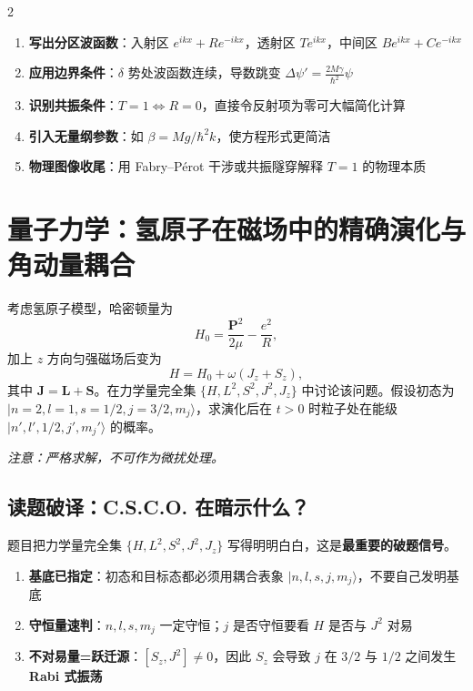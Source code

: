 \begin{multicols}{2}
\begin{thinkbox}
\begin{enumerate}
    \item \textbf{写出分区波函数}：入射区 $e^{ikx}+Re^{-ikx}$，透射区 $Te^{ikx}$，中间区 $Be^{ikx}+Ce^{-ikx}$
    \item \textbf{应用边界条件}：$\delta$ 势处波函数连续，导数跳变 $\Delta\psi' = \frac{2M\gamma}{\hbar^2}\psi$
    \item \textbf{识别共振条件}：$T=1 \Leftrightarrow R=0$，直接令反射项为零可大幅简化计算
    \item \textbf{引入无量纲参数}：如 $\beta = Mg/\hbar^2 k$，使方程形式更简洁
    \item \textbf{物理图像收尾}：用 Fabry--P\'erot 干涉或共振隧穿解释 $T=1$ 的物理本质
\end{enumerate}
\end{thinkbox}

\end{multicols}


\newpage
\section{量子力学：氢原子在磁场中的精确演化与角动量耦合}
\label{sec:zeeman-evolution}

\begin{modelbox}
考虑氢原子模型，哈密顿量为
\[
H_0 = \frac{\bm{P}^2}{2\mu} - \frac{e^2}{R},
\]
加上 $z$ 方向匀强磁场后变为
\[
H = H_0 + \omega (J_z + S_z),
\]
其中 $\bm{J} = \bm{L} + \bm{S}$。在力学量完全集 $\{H, L^2, S^2, J^2, J_z\}$ 中讨论该问题。假设初态为 $|n=2, l=1, s=1/2, j=3/2, m_j\rangle$，求演化后在 $t>0$ 时粒子处在能级 $|n', l', 1/2, j', m_j'\rangle$ 的概率。

\textit{注意：严格求解，不可作为微扰处理。}
\end{modelbox}

\subsection{读题破译：C.S.C.O. 在暗示什么？}

题目把力学量完全集 $\{H, L^2, S^2, J^2, J_z\}$ 写得明明白白，这是\textbf{最重要的破题信号}。

\begin{insightbox}[读懂 C.S.C.O. 的三重暗示]
\begin{enumerate}[nosep]
    \item \textbf{基底已指定}：初态和目标态都必须用耦合表象 $|n,l,s,j,m_j\rangle$，不要自己发明基底
    \item \textbf{守恒量速判}：$n, l, s, m_j$ 一定守恒；$j$ 是否守恒要看 $H$ 是否与 $J^2$ 对易
    \item \textbf{不对易量=跃迁源}：$[S_z, J^2] \neq 0$，因此 $S_z$ 会导致 $j$ 在 $3/2$ 与 $1/2$ 之间发生\textbf{Rabi 式振荡}
\end{enumerate}
\end{insightbox}


